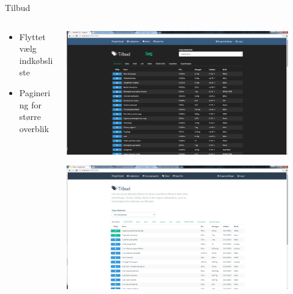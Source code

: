 \begin{frame}{Tilbud}
	
	\begin{minipage}[0.3\textheight]{\textwidth}
	\begin{columns}[T]
	\begin{column}{0.5\textwidth}
	\begin{itemize}
	\item Flyttet vælg indkøbsliste
	\item Paginering for større overblik

	
	\end{itemize}
	\end{column}
	\begin{column}{0.5\textwidth}
	 \includegraphics[width=0.9\textwidth,height=0.8\textheight,keepaspectratio]{images/Screenshots/OffersOld.png}
	 
	 \vspace{2 mm}
	  
	  \includegraphics[width=0.9\textwidth,height=0.8\textheight,keepaspectratio]{images/Screenshots/Offers.png}
	\end{column}
	\end{columns}
	

  \end{minipage}
  
  	
\end{frame}
